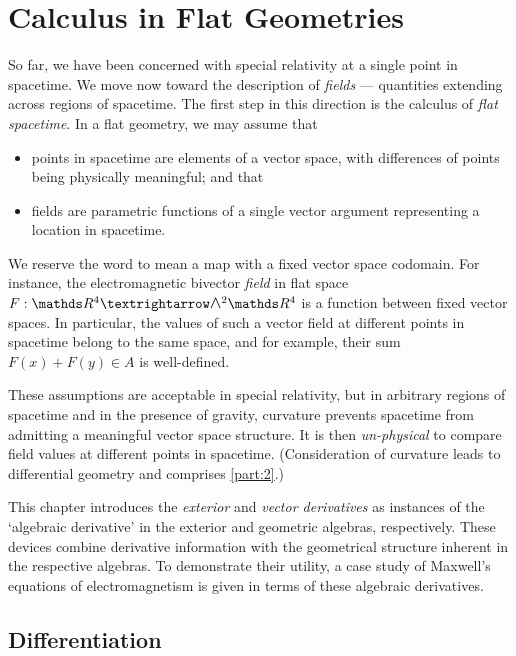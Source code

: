 \chapter{Calculus in Flat Geometries}

So far, we have been concerned with special relativity at a single point in spacetime.
We move now toward the description of \emph{fields} --- quantities extending across regions of spacetime.
The first step in this direction is the calculus of \emph{flat spacetime}.
In a flat geometry, we may assume that
\begin{itemize}
	\item points in spacetime are elements of a vector space, with differences of points being physically meaningful; and that
	\item fields are parametric functions of a single vector argument representing a location in spacetime.
\end{itemize}
We reserve the word  to mean a map with a fixed vector space codomain.
For instance, the electromagnetic bivector \emph{field} in flat space $F : \RR^4 → \EA[2]{\RR^4}$ is a function between fixed vector spaces.
In particular, the values of such a vector field at different points in spacetime belong to the same space, and for example, their sum $F(x) + F(y) ∈ A$ is well-defined.

These assumptions are acceptable in special relativity, but in arbitrary regions of spacetime and in the presence of gravity, curvature prevents spacetime from admitting a meaningful vector space structure.
It is then \emph{un-physical} to compare field values at different points in spacetime.
(Consideration of curvature leads to differential geometry and comprises \cref{part:2}.)

This chapter introduces the \emph{exterior} and \emph{vector derivatives} as instances of the `algebraic derivative' in the exterior and geometric algebras, respectively.
These devices combine derivative information with the geometrical structure inherent in the respective algebras.
To demonstrate their utility, a case study of Maxwell's equations of electromagnetism is given in terms of these algebraic derivatives.


\section{Differentiation}
\label{sec:algder}

